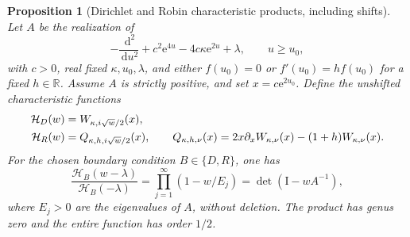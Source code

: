 \documentclass[11pt,letterpaper]{article}
\numberwithin{equation}{section}
\newtheorem{proposition}[theorem]{Proposition}
\theoremstyle{definition}
\theoremstyle{remark}
\newcommand{\R}{\mathbb R}
\newcommand{\Id}{\mathrm I}
\newcommand{\dd}{\,\mathrm d}
\newcommand{\e}{\mathrm e}
\begin{document}
\begin{proposition}[Dirichlet and Robin characteristic products, including shifts]
\label{prop:whittakerproducts}
Let $A$ be the realization of
\begin{equation}
 -\frac{\dd^2}{\dd u^2}+c^2\e^{4u}-4c\kappa\e^{2u}+\lambda,
 \qquad u\geq u_0,
 \label{eq:shiftedmorsedifferential}
\end{equation}
with $c>0$, real fixed $\kappa,u_0,\lambda$, and either $f(u_0)=0$ or $f'(u_0)=h f(u_0)$ for a fixed $h\in\R$. Assume $A$ is strictly positive, and set $x=c\e^{2u_0}$. Define the unshifted characteristic functions
\begin{align}
 \mathcal H_D(w)&=W_{\kappa,i\sqrt w/2}(x),\notag\\
 \mathcal H_R(w)&=Q_{\kappa,h,i\sqrt w/2}(x),\qquad
 Q_{\kappa,h,\nu}(x)=2x\partial_xW_{\kappa,\nu}(x)-(1+h)W_{\kappa,\nu}(x).
 \label{eq:robincharacteristic}
\end{align}
For the chosen boundary condition $B\in\{D,R\}$, one has
\begin{equation}
 \frac{\mathcal H_B(w-\lambda)}{\mathcal H_B(-\lambda)}
 =\prod_{j=1}^{\infty}(1-w/E_j)
 =\det(\Id-wA^{-1}),
 \label{eq:shiftedcharacteristicproduct}
\end{equation}
where $E_j>0$ are the eigenvalues of $A$, without deletion. The product has genus zero and the entire function has order $1/2$.
\end{proposition}
\end{document}
